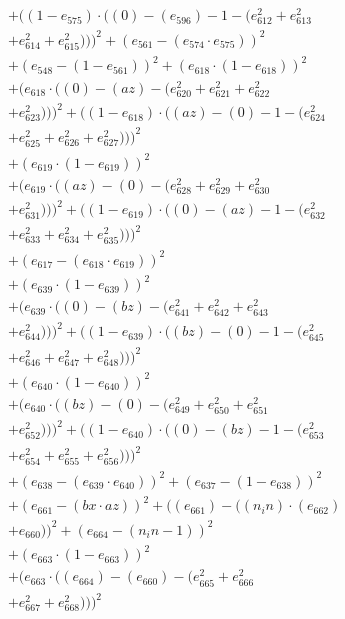 \documentclass[10pt, a4paper]{article}
\begin{document}
\begin{align*}
& + ((1 - e_{575})  \cdot  ((0) - (e_{596}) - 1 - (e_{612}^{2} + e_{613}^{2} \\
& + e_{614}^{2} + e_{615}^{2})))^{2} + (e_{561} - (e_{574}  \cdot  e_{575}))^{2} \\
& + (e_{548} - (1 - e_{561}))^{2} + (e_{618}  \cdot  (1 - e_{618}))^{2} \\
& + (e_{618}  \cdot  ((0) - (az) - (e_{620}^{2} + e_{621}^{2} + e_{622}^{2} \\
& + e_{623}^{2})))^{2} + ((1 - e_{618})  \cdot  ((az) - (0) - 1 - (e_{624}^{2} \\
& + e_{625}^{2} + e_{626}^{2} + e_{627}^{2})))^{2} \\
& + (e_{619}  \cdot  (1 - e_{619}))^{2} \\
& + (e_{619}  \cdot  ((az) - (0) - (e_{628}^{2} + e_{629}^{2} + e_{630}^{2} \\
& + e_{631}^{2})))^{2} + ((1 - e_{619})  \cdot  ((0) - (az) - 1 - (e_{632}^{2} \\
& + e_{633}^{2} + e_{634}^{2} + e_{635}^{2})))^{2} \\
& + (e_{617} - (e_{618}  \cdot  e_{619}))^{2} \\
& + (e_{639}  \cdot  (1 - e_{639}))^{2} \\
& + (e_{639}  \cdot  ((0) - (bz) - (e_{641}^{2} + e_{642}^{2} + e_{643}^{2} \\
& + e_{644}^{2})))^{2} + ((1 - e_{639})  \cdot  ((bz) - (0) - 1 - (e_{645}^{2} \\
& + e_{646}^{2} + e_{647}^{2} + e_{648}^{2})))^{2} \\
& + (e_{640}  \cdot  (1 - e_{640}))^{2} \\
& + (e_{640}  \cdot  ((bz) - (0) - (e_{649}^{2} + e_{650}^{2} + e_{651}^{2} \\
& + e_{652}^{2})))^{2} + ((1 - e_{640})  \cdot  ((0) - (bz) - 1 - (e_{653}^{2} \\
& + e_{654}^{2} + e_{655}^{2} + e_{656}^{2})))^{2} \\
& + (e_{638} - (e_{639}  \cdot  e_{640}))^{2} + (e_{637} - (1 - e_{638}))^{2} \\
& + (e_{661} - (bx  \cdot  az))^{2} + ((e_{661}) - ((n_in)  \cdot  (e_{662}) \\
& + e_{660}))^{2} + (e_{664} - (n_in - 1))^{2} \\
& + (e_{663}  \cdot  (1 - e_{663}))^{2} \\
& + (e_{663}  \cdot  ((e_{664}) - (e_{660}) - (e_{665}^{2} + e_{666}^{2} \\
& + e_{667}^{2} + e_{668}^{2})))^{2} \\

\end{align*}
\end{document}

